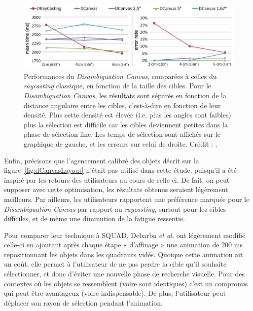 	\begin{figure}[H]
		\centering
		\includegraphics[width=\textwidth]{figures/ch2/dCanvasRCPerf}
		\caption[\emph{Disambiguation Canvas} --- Performances I]{Performances du \emph{Disambiguation Canvas}, comparées à celles du \emph{raycasting} classique, en fonction de la taille des cibles. Pour le \emph{Disambiguation Canvas}, les résultats sont séparés en fonction de la distance angulaire entre les cibles, c'est-à-dire en fonction de leur densité. Plus cette densité est élevée (i.e. plus les angles sont faibles) plus la sélection est difficile car les cibles deviennent petites dans la phase de sélection fine. Les temps de sélection sont affichés sur le graphique de gauche, et les erreurs sur celui de droite. Crédit : \cite{debarba2013disambiguation}.}
		\label{fig:dCanvasRCPerf}
	\end{figure}

	Enfin, précisons que l'agencement calibré des objets décrit sur la figure~\ref{fig:dCanvasLayout} n'était pas utilisé dans cette étude, puisqu'il a été inspiré par les retours des utilisateurs au cours de celle-ci. De fait, on peut supposer avec cette optimisation, les résultats obtenus seraient légèrement meilleurs. Par ailleurs, les utilisateurs rapportent une préférence marquée pour le \emph{Disambiguation Canvas} par rapport au \emph{raycasting}, surtout pour les cibles difficiles, et de même une diminution de la fatigue ressentie.
	
	Pour comparer leur technique à SQUAD, Debarba \emph{et al.} ont légèrement modifié celle-ci en ajoutant après chaque étape « d'affinage » une animation de 200 ms repositionnant les objets dans les quadrants vidés. Quoique cette animation ait un coût, elle permet à l'utilisateur de ne pas perdre la cible qu'il souhaite sélectionner, et donc d'éviter une nouvelle phase de recherche visuelle. Pour des contextes où les objets se ressemblent (voire sont identiques) c'est un compromis qui peut être avantageux (voire indispensable). De plus, l'utilisateur peut déplacer son rayon de sélection pendant l'animation.
	
